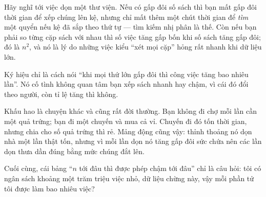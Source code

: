 \documentclass[../../algorithm.tex]{subfiles}
\begin{document}
\begin{dongian}
Hãy nghĩ tới việc dọn một thư viện. Nếu có gấp đôi số sách thì bạn mất gấp đôi thời gian để xếp chúng lên kệ, nhưng chỉ mất thêm một chút thời gian để \emph{tìm} một quyển nếu kệ đã sắp theo thứ tự --- tìm kiếm nhị phân là thế. Còn nếu bạn phải so từng cặp sách với nhau thì số việc tăng gấp bốn khi số sách tăng gấp đôi; đó là \(n^2\), và nó là lý do những việc kiểu ``xét mọi cặp'' hỏng rất nhanh khi dữ liệu lớn.

Ký hiệu \Ob{\cdot} chỉ là cách nói ``khi mọi thứ lớn gấp đôi thì công việc tăng bao nhiêu lần''. Nó cố tình không quan tâm bạn xếp sách nhanh hay chậm, vì cái đó đổi theo người, còn tỉ lệ tăng thì không.

Khấu hao là chuyện khác và cũng rất đời thường. Bạn không đi chợ mỗi lần cần một quả trứng; bạn đi một chuyến và mua cả vỉ. Chuyến đi đó tốn thời gian, nhưng chia cho số quả trứng thì rẻ. Mảng động cũng vậy: thỉnh thoảng nó dọn nhà một lần thật tốn, nhưng vì mỗi lần dọn nó tăng gấp đôi sức chứa nên các lần dọn thưa dần đúng bằng mức chúng đắt lên.

Cuối cùng, cái bảng ``\(n\) tới đâu thì được phép chậm tới đâu'' chỉ là câu hỏi: tôi có ngân sách khoảng một trăm triệu việc nhỏ, dữ liệu chừng này, vậy mỗi phần tử tôi được làm bao nhiêu việc?
\end{dongian}
\end{document}

